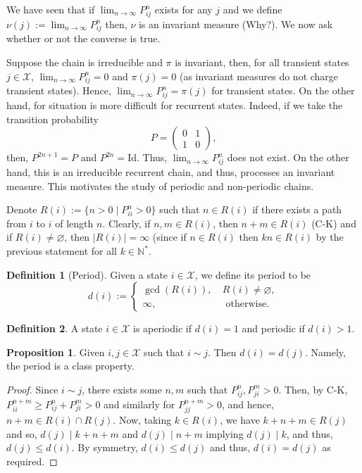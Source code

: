 \documentclass[]{article}
\theoremstyle{definition}
\theoremstyle{definition}
\newtheorem{definition}{Definition}[section]
\newtheorem{proposition}{Proposition}[section]
\begin{document}
We have seen that if \(\lim_{n \to \infty} P^n_{ij}\) exists for any \(j\) and 
we define \(\nu(j) := \lim_{n \to \infty} P^n_{ij}\) then, \(\nu\) is an invariant 
measure (Why?). We now ask whether or not the converse is true. 

Suppose 
the chain is irreducible and \(\pi\) is invariant, then, for all transient states 
\(j \in \mathcal{X}\), \(\lim_{n \to \infty} P^n_{ij} = 0\) and \(\pi(j) = 0\) 
(as invariant measures do not charge transient states). Hence, 
\(\lim_{n \to \infty} P^n_{ij} = \pi(j)\) for transient states.
On the other hand, for situation is more difficult for recurrent states. 
Indeed, if we take the transition probability 
\[P = \begin{pmatrix}
  0 & 1 \\ 1 & 0
\end{pmatrix},\]
then, \(P^{2n + 1} = P\) and \(P^{2n} = \text{Id}\). Thus, 
\(\lim_{n \to \infty} P^n_{ij}\) does not exist. On the other hand, this is an 
irreducible recurrent chain, and thus, processes an invariant measure.
This motivates the study of periodic and non-periodic chains.

Denote \(R(i) := \{n > 0 \mid P^n_{ii} > 0\}\) such that \(n \in R(i)\) if 
there exists a path from \(i\) to \(i\) of length \(n\). Clearly, 
if \(n, m \in R(i)\), then \(n + m \in R(i)\) (C-K) and if \(R(i) \neq \varnothing\), 
then \(|R(i)| = \infty\) (since if \(n \in R(i)\) then \(kn \in R(i)\) by the 
previous statement for all \(k \in \mathbb{N}^*\).

\begin{definition}[Period]
  Given a state \(i \in \mathcal{X}\), we define its period to be 
  \[d(i) := \begin{cases}
    \gcd(R(i)), & \ R(i) \neq \varnothing,\\
    \infty, & \ \text{ otherwise}.
  \end{cases}\]
\end{definition}

\begin{definition}
  A state \(i \in \mathcal{X}\) is aperiodic if \(d(i) = 1\) and periodic if 
  \(d(i) > 1\).
\end{definition}

\begin{proposition}
  Given \(i, j \in \mathcal{X}\) such that \(i \sim j\). Then \(d(i) = d(j)\).
  Namely, the period is a class property.
\end{proposition}
\begin{proof}
  Since \(i \sim j\), there exists some \(n, m\) such that \(P^n_{ij}, P^m_{ji} > 0\).
  Then, by C-K, \(P^{n + m}_{ii} \ge P^{n}_{ij} + P^{m}_{ji} > 0\) and 
  similarly for \(P^{n + m}_{jj} > 0\), and hence, \(n + m \in R(i) \cap R(j)\).
  Now, taking \(k \in R(i)\), we have \(k + n + m \in R(j)\) and so, 
  \(d(j) \mid k + n + m\) and \(d(j) \mid n + m\) implying \(d(j) \mid k\), 
  and thus, \(d(j) \le d(i)\). By symmetry, \(d(i) \le d(j)\) and thus, 
  \(d(i) = d(j)\) as required.
\end{proof}
\end{document}
